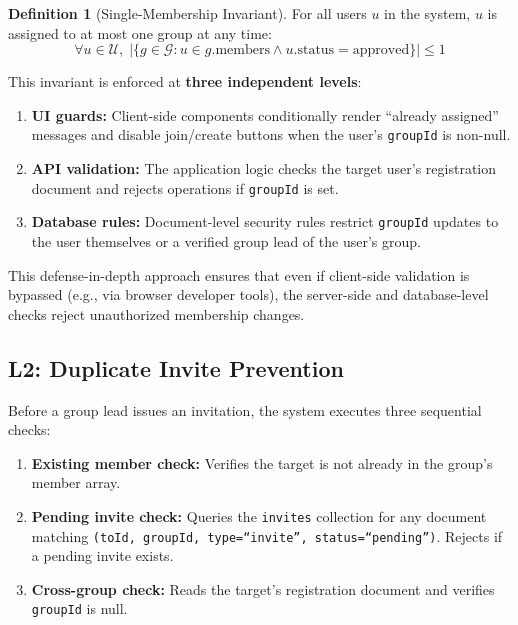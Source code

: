 \documentclass[11pt,a4paper]{article}
\theoremstyle{plain}
\theoremstyle{definition}
\newtheorem{definition}[theorem]{Definition}
\theoremstyle{remark}
\begin{document}
\begin{definition}[Single-Membership Invariant]
For all users $u$ in the system, $u$ is assigned to at most one group at any time:
\begin{equation}
    \forall u \in \mathcal{U},\; |\{g \in \mathcal{G} : u \in g.\text{members} \wedge u.\text{status} = \text{approved}\}| \leq 1
\end{equation}
\end{definition}

This invariant is enforced at \textbf{three independent levels}:
\begin{enumerate}[noitemsep,topsep=3pt]
    \item \textbf{UI guards:} Client-side components conditionally render ``already assigned'' messages and disable join/create buttons when the user's \texttt{groupId} is non-null.
    \item \textbf{API validation:} The application logic checks the target user's registration document and rejects operations if \texttt{groupId} is set.
    \item \textbf{Database rules:} Document-level security rules restrict \texttt{groupId} updates to the user themselves or a verified group lead of the user's group.
\end{enumerate}

This defense-in-depth approach ensures that even if client-side validation is bypassed (e.g., via browser developer tools), the server-side and database-level checks reject unauthorized membership changes.

\subsection{L2: Duplicate Invite Prevention}

Before a group lead issues an invitation, the system executes three sequential checks:
\begin{enumerate}[noitemsep,topsep=3pt]
    \item \textbf{Existing member check:} Verifies the target is not already in the group's member array.
    \item \textbf{Pending invite check:} Queries the \texttt{invites} collection for any document matching \texttt{(toId, groupId, type=``invite'', status=``pending'')}. Rejects if a pending invite exists.
    \item \textbf{Cross-group check:} Reads the target's registration document and verifies \texttt{groupId} is null.
\end{enumerate}
\end{document}
